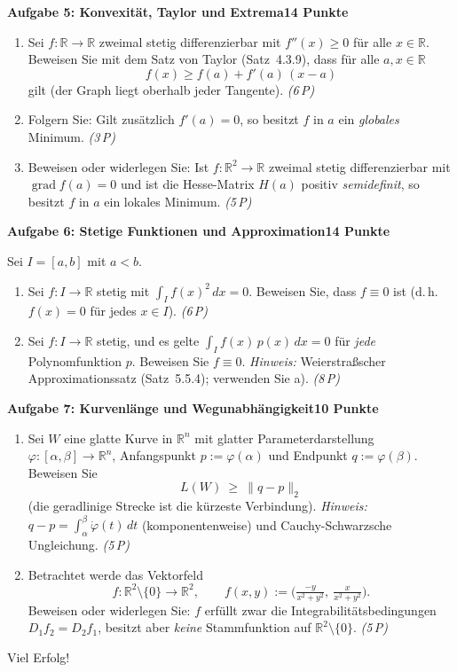 \documentclass[a4paper,12pt]{article}
\newcommand{\pkt}[1]{\hfill\textit{(#1\,P)}}
\newcommand{\aufgabe}[3]{%
  \bigskip\par\noindent\textbf{Aufgabe #1: #2}\hfill\textbf{#3 Punkte}%
  \par\nobreak\medskip}
\begin{document}
\aufgabe{5}{Konvexität, Taylor und Extrema}{14}

\begin{enumerate}[label=\alph*)]
  \item Sei $f:\mathbb{R}\to\mathbb{R}$ zweimal stetig differenzierbar mit $f''(x)\ge 0$ für alle
  $x\in\mathbb{R}$. Beweisen Sie mit dem Satz von Taylor (Satz~4.3.9), dass für alle $a,x\in\mathbb{R}$
  \[ f(x)\ge f(a)+f'(a)\,(x-a) \]
  gilt (der Graph liegt oberhalb jeder Tangente). \pkt{6}
  \item Folgern Sie: Gilt zusätzlich $f'(a)=0$, so besitzt $f$ in $a$ ein \emph{globales} Minimum. \pkt{3}
  \item Beweisen oder widerlegen Sie: Ist $f:\mathbb{R}^2\to\mathbb{R}$ zweimal stetig differenzierbar
  mit $\operatorname{grad} f(a)=0$ und ist die Hesse-Matrix $H(a)$ positiv \emph{semidefinit}, so besitzt
  $f$ in $a$ ein lokales Minimum. \pkt{5}
\end{enumerate}

\aufgabe{6}{Stetige Funktionen und Approximation}{14}

Sei $I=[a,b]$ mit $a<b$.
\begin{enumerate}[label=\alph*)]
  \item Sei $f:I\to\mathbb{R}$ stetig mit $\displaystyle\int_I f(x)^2\,dx=0$. Beweisen Sie, dass
  $f\equiv 0$ ist (d.\,h.\ $f(x)=0$ für jedes $x\in I$). \pkt{6}
  \item Sei $f:I\to\mathbb{R}$ stetig, und es gelte $\displaystyle\int_I f(x)\,p(x)\,dx=0$ für
  \emph{jede} Polynomfunktion $p$. Beweisen Sie $f\equiv 0$.
  \emph{Hinweis:} Weierstraßscher Approximationssatz (Satz~5.5.4); verwenden Sie a). \pkt{8}
\end{enumerate}

\aufgabe{7}{Kurvenlänge und Wegunabhängigkeit}{10}

\begin{enumerate}[label=\alph*)]
  \item Sei $W$ eine glatte Kurve in $\mathbb{R}^n$ mit glatter Parameterdarstellung
  $\varphi:[\alpha,\beta]\to\mathbb{R}^n$, Anfangspunkt $p:=\varphi(\alpha)$ und Endpunkt
  $q:=\varphi(\beta)$. Beweisen Sie
  \[ L(W)\ \ge\ \|q-p\|_2 \]
  (die geradlinige Strecke ist die kürzeste Verbindung).
  \emph{Hinweis:} $q-p=\int_\alpha^\beta \dot\varphi(t)\,dt$ (komponentenweise) und
  Cauchy-Schwarzsche Ungleichung. \pkt{5}
  \item Betrachtet werde das Vektorfeld
  \[ f:\mathbb{R}^2\setminus\{0\}\to\mathbb{R}^2,\qquad
     f(x,y):=\Big(\tfrac{-y}{x^2+y^2},\ \tfrac{x}{x^2+y^2}\Big). \]
  Beweisen oder widerlegen Sie: $f$ erfüllt zwar die Integrabilitätsbedingungen
  $D_1 f_2=D_2 f_1$, besitzt aber \emph{keine} Stammfunktion auf $\mathbb{R}^2\setminus\{0\}$. \pkt{5}
\end{enumerate}

\vfill
\begin{center}\small Viel Erfolg!\end{center}
\end{document}
